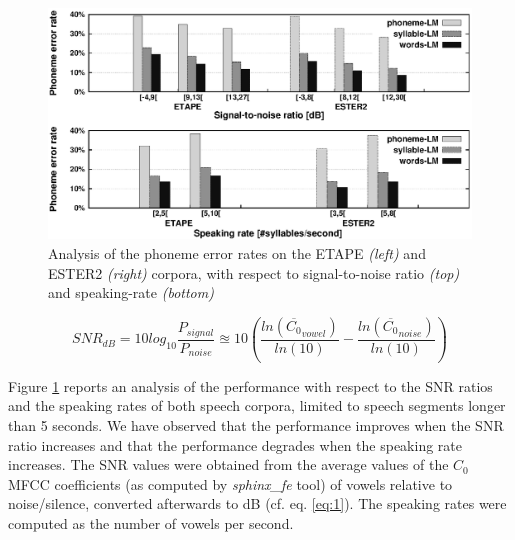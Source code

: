 \documentclass[runningheads,a4paper]{llncs}
\begin{document}
\begin{figure}[t!]
\begin{centering}
\includegraphics[scale=0.74]{Image/all}
\caption{ Analysis of the phoneme error rates on the ETAPE \textit{(left)} and ESTER2 \textit{(right)} corpora, with respect to signal-to-noise ratio \textit{(top)} and speaking-rate \textit{(bottom)} }
\label{Fig:stats}
\end{centering}
\end{figure}

\begin{equation}
SNR_{dB}=10log_{10}\frac{P_{signal}}{P_{noise}}\approxeq10\left(\frac{ln\left(\overline{C_{0}}_{vowel}\right)}{ln\left(10\right)}-\frac{ln\left(\overline{C_{0}}_{noise}\right)}{ln\left(10\right)}\right)
\label{eq:1}
\end{equation}

Figure \ref{Fig:stats} reports an analysis of the performance with respect to the SNR ratios and the speaking rates of both speech corpora, limited to speech segments longer than 5 seconds. We have observed that the performance improves when the SNR ratio increases and that the performance degrades when the speaking rate increases. The SNR values were obtained from the average values of the $C_{0}$ MFCC coefficients (as computed by \textit{sphinx\_fe} tool) of vowels relative to noise/silence, converted afterwards to dB (cf. eq. \ref{eq:1}). The speaking rates were computed as the number of vowels per second.
\end{document}

